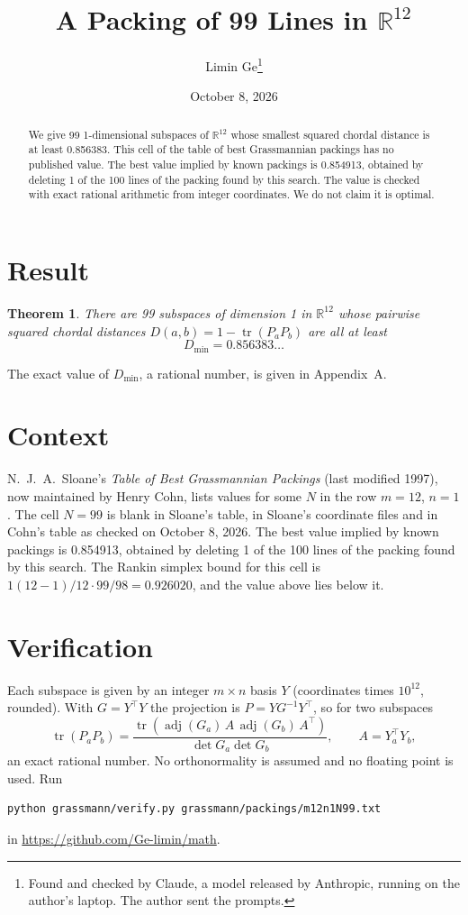 \documentclass[11pt,a4paper]{article}
\title{A Packing of 99 Lines in $\mathbb{R}^{12}$}
\author{Limin Ge\thanks{Found and checked by Claude, a model released by Anthropic, running on the author's laptop. The author sent the prompts.}}
\date{October 8, 2026}
\newtheorem*{theorem}{Theorem}
\begin{document}
\maketitle
\begin{abstract}
We give 99 1-dimensional subspaces of $\mathbb{R}^{12}$ whose smallest squared chordal distance is at least 0.856383. This cell of the table of best Grassmannian packings has no published value. The best value implied by known packings is 0.854913, obtained by deleting 1 of the 100 lines of the packing found by this search. The value is checked with exact rational arithmetic from integer coordinates. We do not claim it is optimal.
\end{abstract}

\section{Result}
\begin{theorem}
There are 99 subspaces of dimension 1 in $\mathbb{R}^{12}$ whose pairwise squared chordal distances $D(a,b) = 1 - \operatorname{tr}(P_aP_b)$ are all at least
\[ D_{\min} = 0.856383\ldots \]
\end{theorem}
The exact value of $D_{\min}$, a rational number, is given in Appendix~A.


\section{Context}
N.~J.~A.~Sloane's \emph{Table of Best Grassmannian Packings} (last modified 1997), now maintained by Henry Cohn, lists values for some $N$ in the row $m=12$, $n=1$. The cell $N=99$ is blank in Sloane's table, in Sloane's coordinate files and in Cohn's table as checked on October 8, 2026. The best value implied by known packings is 0.854913, obtained by deleting 1 of the 100 lines of the packing found by this search. The Rankin simplex bound for this cell is $1(12-1)/12\cdot 99/98 = 0.926020$, and the value above lies below it.


\section{Verification}
Each subspace is given by an integer $m\times n$ basis $Y$ (coordinates times $10^{12}$, rounded). With $G=Y^\top Y$ the projection is $P=YG^{-1}Y^\top$, so for two subspaces
\[ \operatorname{tr}(P_aP_b)=\frac{\operatorname{tr}(\operatorname{adj}(G_a)\,A\,\operatorname{adj}(G_b)\,A^\top)}{\det G_a\det G_b},\qquad A=Y_a^\top Y_b, \]
an exact rational number. No orthonormality is assumed and no floating point is used. Run
\begin{verbatim}
python grassmann/verify.py grassmann/packings/m12n1N99.txt
\end{verbatim}
in \url{https://github.com/Ge-limin/math}.
\end{document}
